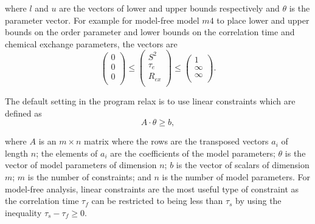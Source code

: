 \begin{htmlonly}
\begin{htmlonly}
\noindent where $l$ and $u$ are the vectors of lower and upper bounds respectively and $\theta$ is the parameter vector.  For example for model-free model $m4$ to place lower and upper bounds on the order parameter and lower bounds on the correlation time and chemical exchange parameters, the vectors are
\begin{equation}
    \begin{pmatrix}
        0 \\
        0 \\
        0 \\
    \end{pmatrix}
    \leqslant
    \begin{pmatrix}
        S^2 \\
        \tau_e \\
        R_{ex} \\
    \end{pmatrix}
    \leqslant
    \begin{pmatrix}
        1 \\
        \infty \\
        \infty \\
    \end{pmatrix}.
\end{equation}

The default setting in the program relax is to use linear constraints which are defined as
\begin{equation} \label{eq: linear constraint}
    A \cdot \theta \geqslant b,
\end{equation}

\noindent where $A$ is an $m \times n$ matrix where the rows are the transposed vectors $a_i$ of length $n$; the elements of $a_i$ are the coefficients of the model parameters; $\theta$ is the vector of model parameters of dimension $n$; $b$ is the vector of scalars of dimension $m$; $m$ is the number of constraints; and $n$ is the number of model parameters.  For model-free analysis, linear constraints are the most useful type of constraint as the correlation time $\tau_f$ can be restricted to being less than $\tau_s$ by using the inequality $\tau_s - \tau_f \geqslant 0$.


\end{htmlonly}
\end{htmlonly}
